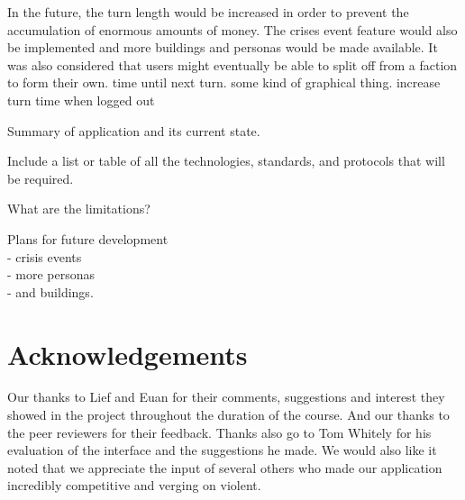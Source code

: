 \documentclass{sig-alt-release2}
\begin{document}
In the future, the turn length would be increased in order to prevent the accumulation of enormous amounts of money. The crises event feature would also be implemented and more buildings and personas would be made available. It was also considered that users might eventually be able to split off from a faction to form their own. time until next turn. some kind of graphical thing. increase turn time when logged out

Summary of application and its current state.

Include a list or table of all the technologies, standards, and protocols that will be required.

What are the limitations?

Plans for future development \\
- crisis events\\
- more personas\\
- and buildings.\\

\section{Acknowledgements}
Our thanks to Lief and Euan for their comments, suggestions and interest they showed in the project throughout the duration of the course. And our thanks to the peer reviewers for their feedback.
Thanks also go to Tom Whitely for his evaluation of the interface and the suggestions he made.
We would also like it noted that we appreciate the input of several others who made our application incredibly competitive and verging on violent.



\end{document}
